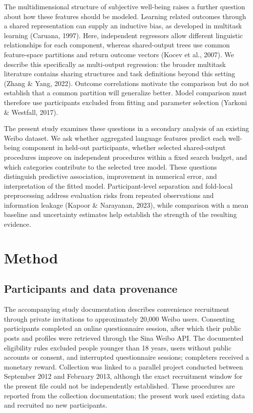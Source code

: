 \documentclass[11pt,letterpaper]{article}
\begin{document}
The multidimensional structure of subjective well-being raises a further question about how these features should be modeled. Learning related outcomes through a shared representation can supply an inductive bias, as developed in multitask learning (Caruana, 1997). Here, independent regressors allow different linguistic relationships for each component, whereas shared-output trees use common feature-space partitions and return outcome vectors (Kocev et al., 2007). We describe this specifically as multi-output regression: the broader multitask literature contains sharing structures and task definitions beyond this setting (Zhang \& Yang, 2022). Outcome correlations motivate the comparison but do not establish that a common partition will generalize better. Model comparison must therefore use participants excluded from fitting and parameter selection (Yarkoni \& Westfall, 2017).

The present study examines these questions in a secondary analysis of an existing Weibo dataset. We ask whether aggregated language features predict each well-being component in held-out participants, whether selected shared-output procedures improve on independent procedures within a fixed search budget, and which categories contribute to the selected tree model. These questions distinguish predictive association, improvement in numerical error, and interpretation of the fitted model. Participant-level separation and fold-local preprocessing address evaluation risks from repeated observations and information leakage (Kapoor \& Narayanan, 2023), while comparison with a mean baseline and uncertainty estimates help establish the strength of the resulting evidence.

\section{Method}\label{method}

\subsection{Participants and data provenance}\label{participants-and-data-provenance}

The accompanying study documentation describes convenience recruitment through private invitations to approximately 20,000 Weibo users. Consenting participants completed an online questionnaire session, after which their public posts and profiles were retrieved through the Sina Weibo API. The documented eligibility rules excluded people younger than 18 years, users without public accounts or consent, and interrupted questionnaire sessions; completers received a monetary reward. Collection was linked to a parallel project conducted between September 2012 and February 2013, although the exact recruitment window for the present file could not be independently established. These procedures are reported from the collection documentation; the present work used existing data and recruited no new participants.
\end{document}
